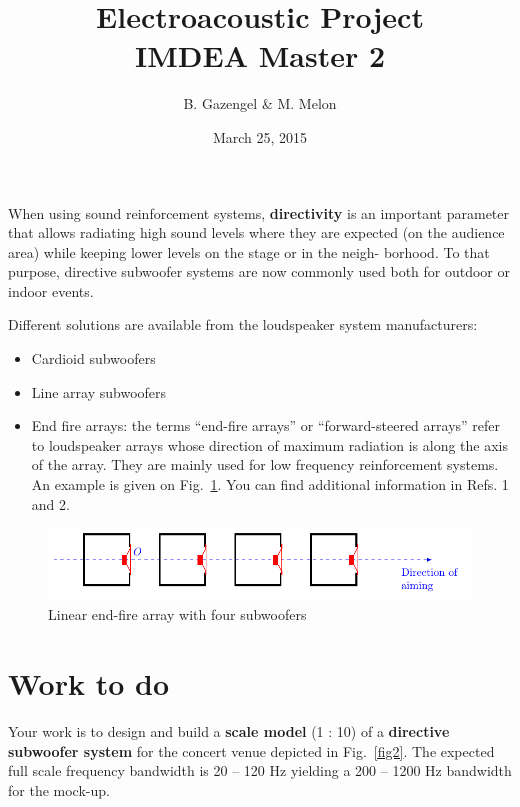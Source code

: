 \documentclass[a4paper, 12pt]{article}
\title{Electroacoustic Project\\IMDEA Master 2}
\author{B. Gazengel \& M. Melon}
\date{March 25, 2015}
\begin{document}
	\maketitle

When using sound reinforcement systems, \textbf{directivity} is an important
parameter that allows radiating high sound levels where they are expected
(on the audience area) while keeping lower levels on the stage or in the neigh-
borhood. To that purpose, directive subwoofer systems are now commonly
used both for outdoor or indoor events.

\noindent Different solutions are available from the loudspeaker system manufacturers:
\begin{itemize}
	\item Cardioid subwoofers
	\item Line array subwoofers
	\item End fire arrays: the terms “end-fire arrays” or “forward-steered arrays” refer to loudspeaker arrays whose
		direction of maximum radiation is along the axis of the array. They are mainly used for low frequency reinforcement
		systems. An example is given on Fig.~\ref{fig1}. You can find additional information in Refs. 1 and 2.
\end{itemize}

\begin{figure}[!ht]
	\centering
	\includegraphics{FIG_1.pdf}
	\caption{\label{fig1}Linear end-fire array with four subwoofers}
\end{figure}

\section{Work to do}
Your work is to design and build a \textbf{scale model} (1 : 10) of a \textbf{directive subwoofer system} for the
concert venue depicted in Fig.~\ref{fig2}. The expected full scale frequency bandwidth is 20 -- 120 Hz yielding a 200 --
1200 Hz bandwidth for the mock-up.
\end{document}
